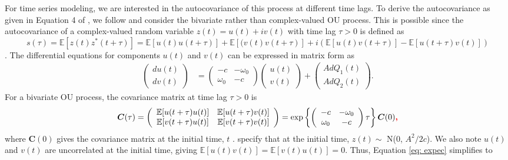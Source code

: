 \documentclass{stat572Style}
\newcommand{\vmadd}[1]{\textbf{\color{red}{#1}}}
\begin{document}
For time series modeling, we are interested in the autocovariance of this process at different time lags. To derive the autocovariance as given in Equation 4 of \citet{Sykulski2016}, we follow \citet{Arato1999} and consider the bivariate rather than complex-valued OU process.
This is possible since the autocovariance of a complex-valued random variable $z(t) = u(t) + i v(t)$ with time lag $\tau >0$ is defined as 
\begin{equation}
\label{eq: expec}
s(\tau) = \mathbb{E}[z(t) z^{*}(t + \tau)] = \mathbb{E}[u(t)u(t + \tau)] + \mathbb{E}[(v(t) v(t + \tau)] + i(\mathbb{E}[u(t) v(t + \tau)] -\mathbb{E}[u(t + \tau)v( t)])
\end{equation}
 \citep{DeIaco2003}. The differential equations for components $u(t)$ and $v(t)$ can be expressed in matrix form as 
\begin{align}
\left( \begin{array}{c} du(t) \\ dv(t) \end{array} \right) &= 
\left( \begin{array}{cc} -c & -\omega_{0} \\ \omega_{0} & -c \end{array} \right) \left( \begin{array}{cc} u(t) \\ v(t) \end{array} \right) + \left( \begin{array}{c} A d Q_{1}(t) \\ Ad Q_{2}(t) \end{array} \right). 
\end{align}
For a bivariate OU process, the covariance matrix at time lag $\tau > 0$ is 
\begin{align}
\label{eq: bivOU}
\boldsymbol{C}(\tau) = \left( \begin{array}{cc} \mathbb{E}[u(t + \tau)u(t)] & \mathbb{E}[u(t + \tau)v(t)] \\ 
\mathbb{E}[v(t + \tau)u(t)] & \mathbb{E}[v(t + \tau) v(t)] \end{array} \right) = \exp \left\{ \left( \begin{array}{cc} -c & -\omega_{0} \\ \omega_{0} & -c \end{array} \right)\tau \right\}\boldsymbol{C}(0)\vmadd{,}
\end{align}
where $\boldsymbol{C}(0)$ gives the covariance matrix at the initial time, $t$ \citep{Schach1971}.  \citet{Sykulski2016} specify that at the initial time, $z(t) \sim$ N(0, $A^{2}/2c$). We also note $u(t)$ and $v(t)$ are uncorrelated at the initial time, giving $\mathbb{E}[u(t)v(t)] = \mathbb{E}[v(t) u(t)] = 0$. Thus, Equation \ref{eq: expec} simplifies to
\end{document}
